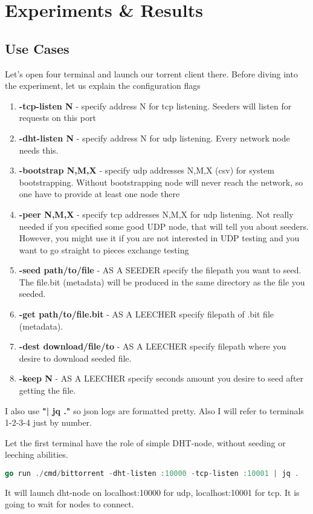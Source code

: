 \documentclass[11pt,a4paper]{article}
\begin{document}
\section{Experiments \& Results}
\subsection{Use Cases}
Let's open four terminal and launch our torrent client there. Before diving into the experiment,
let us explain the configuration flags


\begin{enumerate}
  \item \textbf{-tcp-listen N} - specify address N for tcp listening. Seeders will listen for requests on this port
  \item \textbf{-dht-listen N} - specify address N for udp listening. Every network node needs this.
  \item \textbf{-bootstrap N,M,X} - specify udp addresses N,M,X (csv) for system bootstrapping. Without bootstrapping node will never reach the network, so one have to provide at least one node there
  \item \textbf{-peer N,M,X} - specify tcp addresses N,M,X for udp listening. Not really needed if you specified some good UDP node, that will tell you about seeders. However, you might use it if you are not interested in UDP testing and you want to go straight to pieces exchange testing
  \item \textbf{-seed path/to/file} - AS A SEEDER specify the filepath you want to seed. The file.bit (metadata) will be produced in the same directory as the file you seeded.
  \item \textbf{-get path/to/file.bit} - AS A LEECHER specify filepath of .bit file (metadata).
  \item \textbf{-dest download/file/to} - AS A LEECHER specify filepath where you desire to download seeded file.
  \item \textbf{-keep N} - AS A LEECHER specify seconds amount you desire to seed after getting the file.
\end{enumerate}
I also use \textbf{"| jq ."} so json logs are formatted pretty.
Also I will refer to terminals 1-2-3-4 just by number.

\vspace{4mm} Let the first terminal have the role of simple DHT-node, without seeding or leeching abilities.
\begin{lstlisting}[language=go]
go run ./cmd/bittorrent -dht-listen :10000 -tcp-listen :10001 | jq .
\end{lstlisting}
It will launch dht-node on localhost:10000 for udp, localhost:10001 for tcp. It is going to wait for nodes to connect.
\end{document}
